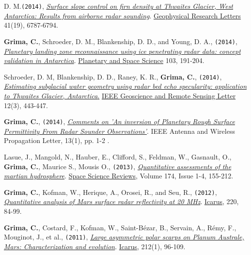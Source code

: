\begin{etaremune}
  D. M.\texttt{(2014)},
  \href{http://onlinelibrary.wiley.com/enhanced/doi/10.1002/2014GL061635/}{\emph{Surface
  slope control on firn density at Thwaites Glacier, West Antarctica:
  Results from airborne radar sounding}}. \ul{Geophysical Research Letters}
  41(19), 6787-6794.
\item
  \textbf{Grima, C.}, Schroeder, D. M., Blankenship, D. D., and Young,
  D. A., \texttt{(2014)},
  \href{http://www.sciencedirect.com/science/article/pii/S0032063314002244}{\emph{Planetary
  landing zone reconnaissance using ice penetrating radar data: concept
  validation in Antarctica}}. \ul{Planetary and Space Science} 103, 191-204.
\item
  Schroeder, D. M, Blankenship, D. D., Raney, K. R., \textbf{Grima, C.},
  \texttt{(2014)},
  \href{http://ieeexplore.ieee.org/xpl/login.jsp?tp=\&arnumber=6901268\&url=http\%3A\%2F\%2Fieeexplore.ieee.org\%2Fstamp\%2Fstamp.jsp\%3Ftp\%3D\%26arnumber\%3D6901268}{\emph{Estimating
  subglacial water geometry using radar bed echo specularity:
  application to Thwaites Glacier, Antarctica}.} \ul{IEEE Geoscience and
  Remote Sensing Letter} 12(3), 443-447.
\item
  \textbf{Grima, C.}, \texttt{(2014)}, \emph{\href{http://ieeexplore.ieee.org/xpl/articleDetails.jsp?tp=\&arnumber=6827185\&queryText\%3Dgrima}{Comments on 'An inversion of Planetary Rough Surface Permittivity From Radar Sounder Observations'}}. IEEE Antenna and Wireless Propagation Letter, 13(1), pp. 1-2 .
\item
  Lasue, J., Mangold, N., Hauber, E., Clifford, S., Feldman, W.,
  Gasnault, O., \textbf{Grima, C.}, Maurice S., Mousis O.,
  \texttt{(2013)},
  \emph{\href{http://www.ig.utexas.edu/pubs/scripts/readpdf.php?contrib=2628}{Quantitative
  assessments of the martian hydrosphere}}. \ul{Space Science Reviews},
  Volume 174, Issue 1-4, 155-212.
\item
  \textbf{Grima, C.}, Kofman, W., Herique, A., Orosei, R., and Seu, R.,
  \texttt{(2012)},
  \href{http://www.sciencedirect.com/science/article/pii/S0019103512001558}{\emph{Quantitative
  analysis of Mars surface radar reflectivity at 20 MHz}}. \ul{Icarus}, 220,
  84-99.
\item
  \textbf{Grima, C.}, Costard, F., Kofman, W., Saint-Bézar, B., Servain,
  A., Rémy, F., Mouginot, J., et al., \texttt{(2011)},
  \href{http://www.sciencedirect.com/science/article/pii/S0019103510004859}{\emph{Large
  asymmetric polar scarps on Planum Australe, Mars: Characterization and
  evolution}}. \ul{Icarus}, 212(1), 96-109.

\end{etaremune}
